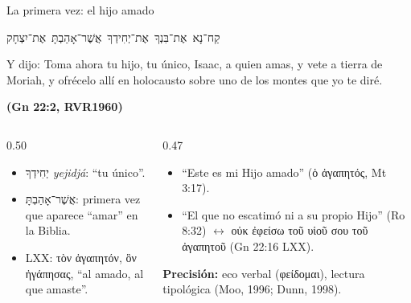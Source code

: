 \documentclass[hyperref={bookmarks=false},aspectratio=169]{beamer}
\newcommand{\heb}[1]{\mbox{\foreignlanguage{hebrew}{#1}}}
\newcommand{\grc}[1]{\foreignlanguage{ancientgreek}{#1}}
\newcommand{\fuente}[1]{\par\hfill{\upshape\bfseries\footnotesize\textcolor{azul}{#1}}}
\newcommand{\precision}[1]{{\footnotesize\color{gris}\textbf{Precisión:} #1}}
\begin{document}
\begin{frame}{La primera vez: el hijo amado}
\begin{center}\heb{קַח־נָא אֶת־בִּנְךָ אֶת־יְחִידְךָ אֲשֶׁר־אָהַבְתָּ אֶת־יִצְחָק}\end{center}
\begin{cita}Y dijo: Toma ahora tu hijo, tu único, Isaac, a quien amas, y vete a tierra de Moriah, y ofrécelo allí en holocausto sobre uno de los montes que yo te diré.\fuente{(Gn 22:2, RVR1960)}\end{cita}
\begin{columns}[t,onlytextwidth]
\begin{column}{0.50\textwidth}\scriptsize
\begin{itemize}
\item \heb{יְחִידְךָ} \emph{yejidjá}: ``tu único''.
\item \heb{אֲשֶׁר־אָהַבְתָּ}: primera vez que aparece ``amar'' en la Biblia.
\item LXX: \grc{τὸν ἀγαπητόν, ὃν ἠγάπησας}, ``al amado, al que amaste''.
\end{itemize}
\end{column}
\begin{column}{0.47\textwidth}\scriptsize
\begin{itemize}
\item ``Este es mi Hijo amado'' (\grc{ὁ ἀγαπητός}, Mt 3:17).
\item ``El que no escatimó ni a su propio Hijo'' (Ro 8:32) $\leftrightarrow$ \grc{οὐκ ἐφείσω τοῦ υἱοῦ σου τοῦ ἀγαπητοῦ} (Gn 22:16 LXX).
\end{itemize}
\precision{eco verbal (\grc{φείδομαι}), lectura tipológica (Moo, 1996; Dunn, 1998).}
\end{column}
\end{columns}
\end{frame}
\end{document}

